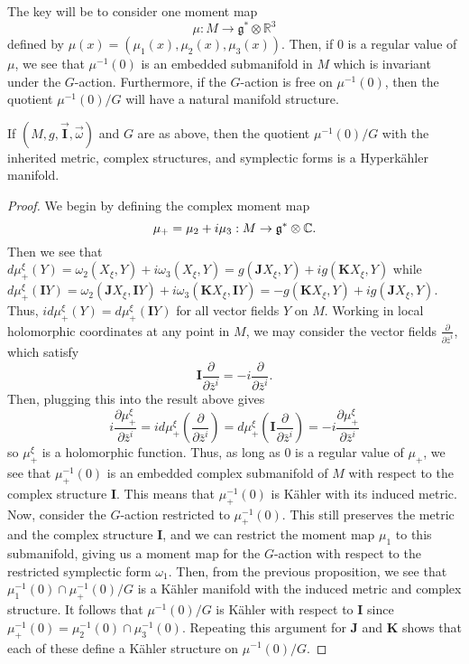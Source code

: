 The key will be to consider one moment map
\begin{equation*}
  \mu: M\to \mathfrak{g}^*\otimes \mathbb{R}^3
\end{equation*}
defined by $\mu(x) = (\mu_1(x),\mu_2(x),\mu_3(x))$. Then, if 0 is a regular value of $\mu$, we see that $\mu^{-1}(0)$ is an embedded submanifold in $M$ which is invariant under the $G$-action. Furthermore, if the $G$-action is free on $\mu^{-1}(0)$, then the quotient $\mu^{-1}(0)/G$ will have a natural manifold structure. 
\begin{prop}
  If $(M,g,\vec{\mathbf{I}},\vec{\omega})$ and $G$ are as above, then the quotient $\mu^{-1}(0)/G$ with the inherited metric, complex structures, and symplectic forms is a Hyperk\"ahler manifold. 
\end{prop}
\begin{proof}
  We begin by defining the complex moment map
\begin{equation*}
  \mu_+ = \mu_2 + i\mu_3 : M \to \mathfrak{g}^*\otimes \mathbb{C}.
\end{equation*}
Then we see that $d\mu_+^\xi(Y) = \omega_2(X_\xi,Y) + i\omega_3(X_\xi,Y) = g(\mathbf{J}X_\xi,Y) + ig(\mathbf{K}X_\xi,Y)$ while $d\mu_+^\xi(\mathbf{I}Y) = \omega_2(\mathbf{J}X_\xi,\mathbf{I}Y) + i\omega_3(\mathbf{K}X_\xi,\mathbf{I}Y) = -g(\mathbf{K}X_\xi,Y) + ig(\mathbf{J}X_\xi,Y)$. Thus, $id\mu_+^\xi(Y) = d\mu_+^\xi(\mathbf{I}Y)$ for all vector fields $Y$ on $M$. Working in local holomorphic coordinates at any point in $M$, we may consider the vector fields $\frac{\partial}{\partial \bar{z}^i}$, which satisfy
\begin{equation*}
  \mathbf{I}\frac{\partial}{\partial \bar{z}^i} = -i \frac{\partial}{\partial \bar{z}^i}.
\end{equation*}
Then, plugging this into the result above gives
\begin{equation*}
  i\frac{\partial \mu^\xi_+}{\partial \bar{z}^i} = id\mu^\xi_+\left(\frac{\partial}{\partial \bar{z}^i}\right)=d\mu^\xi_+\left( \mathbf{I}\frac{\partial}{\partial \bar{z}^i}\right) = -i \frac{\partial \mu^\xi_+}{\partial \bar{z}^i}
\end{equation*}
so $\mu^\xi_+$ is a holomorphic function. Thus, as long as 0 is a regular value of $\mu_+$, we see that $\mu_+^{-1}(0)$ is an embedded complex submanifold of $M$ with respect to the complex structure $\mathbf{I}$. This means that $\mu_+^{-1}(0)$ is K\"ahler with its induced metric. Now, consider the $G$-action restricted to $\mu_+^{-1}(0)$. This still preserves the metric and the complex structure $\mathbf{I}$, and we can restrict the moment map $\mu_1$ to this submanifold, giving us a moment map for the $G$-action with respect to the restricted symplectic form $\omega_1$. Then, from the previous proposition, we see that $\mu_1^{-1}(0)\cap\mu_+^{-1}(0)/G$ is a K\"ahler manifold with the induced metric and complex structure. It follows that $\mu^{-1}(0)/G$ is K\"ahler with respect to $\mathbf{I}$ since $\mu_+^{-1}(0) = \mu_2^{-1}(0)\cap\mu_3^{-1}(0)$. Repeating this argument for $\mathbf{J}$ and $\mathbf{K}$ shows that each of these define a K\"ahler structure on $\mu^{-1}(0)/G$. 
\end{proof}
